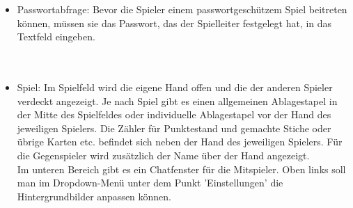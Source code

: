 \documentclass{article}
\begin{document}
\begin{itemize}
		\ \\
	\item Passwortabfrage: Bevor die Spieler einem passwortgeschützem Spiel beitreten können, müssen sie das Passwort, das der 						\gls{Spielleiter} festgelegt hat, in das Textfeld eingeben.\\
		\ \\
		\ \\
	\item Spiel: Im Spielfeld wird die eigene Hand offen und die der anderen Spieler verdeckt angezeigt. Je nach Spiel gibt es 					einen allgemeinen Ablagestapel in der Mitte des Spielfeldes oder individuelle Ablagestapel vor der Hand des 					jeweiligen Spielers. Die Zähler für Punktestand und gemachte Stiche oder übrige Karten etc. befindet sich neben  der 					Hand des jeweiligen Spielers. Für die Gegenspieler wird zusätzlich der Name über der Hand angezeigt.\\
			Im unteren Bereich gibt es ein Chatfenster für die Mitspieler. Oben links soll man im Dropdown-Menü unter dem Punkt 'Einstellungen' die Hintergrundbilder anpassen können.\\
		\ \\
\end{itemize}
\end{document}
